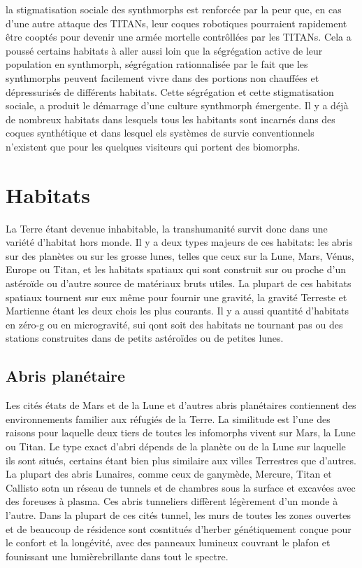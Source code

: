 la stigmatisation sociale des synthmorphs est renforcée par la peur que, en cas d'une autre attaque des TITANs, leur coques robotiques pourraient rapidement être cooptés pour devenir une armée mortelle contrôllées par les TITANs. Cela a poussé certains habitats à aller aussi loin que la ségrégation active de leur population en synthmorph, ségrégation rationnalisée par le fait que les synthmorphs peuvent facilement vivre dans des portions non chauffées et dépressurisés de différents habitats. Cette ségrégation et cette stigmatisation sociale, a produit le démarrage d'une culture synthmorph émergente. Il y a déjà de nombreux habitats dans lesquels tous les habitants sont incarnés dans des coques synthétique et dans lesquel els systèmes de survie conventionnels n'existent que pour les quelques visiteurs qui portent des biomorphs. 

\section{Habitats} \label{sec:habitats} 

La Terre étant devenue inhabitable, la transhumanité survit donc dans une variété d'habitat hors monde. Il y a deux types majeurs de ces habitats: les abris sur des planètes ou sur les grosse lunes, telles que ceux sur la Lune, Mars, Vénus, Europe ou Titan, et les habitats spatiaux qui sont construit sur ou proche d'un astéroïde ou d'autre source de matériaux bruts utiles. La plupart de ces habitats spatiaux tournent sur eux même pour fournir une gravité, la gravité Terreste et Martienne étant les deux chois les plus courants. Il y a aussi quantité d'habitats en zéro-g ou en microgravité, sui qont soit des habitats ne tournant pas ou des stations construites dans de petits astéroïdes ou de petites lunes. 

\subsection{Abris planétaire} \label{sec:plan-settl} 

Les cités états de Mars et de la Lune et d'autres abris planétaires contiennent des environnements familier aux réfugiés de la Terre. La similitude est l'une des raisons pour laquelle deux tiers de toutes les infomorphs vivent sur Mars, la Lune ou Titan. Le type exact d'abri dépends de la planète ou de la Lune sur laquelle ils sont situés, certains étant bien plus similaire aux villes Terrestres que d'autres. La plupart des abris Lunaires, comme ceux de ganymède, Mercure, Titan et Callisto sotn un réseau de tunnels et de chambres sous la surface et excavées avec des foreuses à plasma. Ces abris tunneliers diffèrent légèrement d'un monde à l'autre. Dans la plupart de ces cités tunnel, les murs de toutes les zones ouvertes et de beaucoup de résidence sont cosntitués d'herber génétiquement conçue pour le confort et la longévité, avec des panneaux lumineux couvrant le plafon et founissant une lumièrebrillante dans tout le spectre. 

